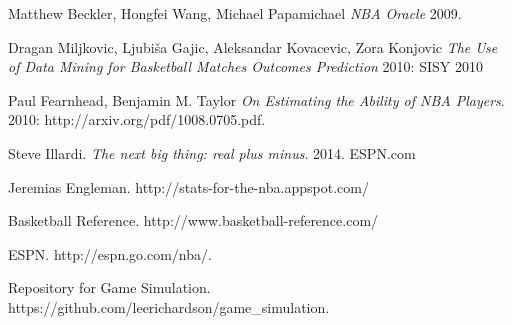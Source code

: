\documentclass{article}
\begin{document}
 
  \begin{thebibliography}{1}

   Matthew Beckler, Hongfei Wang, Michael Papamichael {\em NBA Oracle} 2009.

   Dragan Miljkovic, Ljubiša Gajic, Aleksandar Kovacevic, Zora Konjovic {\em The Use of Data Mining for Basketball Matches
Outcomes Prediction} 2010: SISY 2010

   Paul Fearnhead, Benjamin M. Taylor {\em On Estimating the Ability of NBA Players}. 2010: http://arxiv.org/pdf/1008.0705.pdf.

   Steve Illardi. {\em The next big thing: real plus minus}. 2014. ESPN.com

   Jeremias Engleman. http://stats-for-the-nba.appspot.com/

   Basketball Reference. http://www.basketball-reference.com/

   ESPN. http://espn.go.com/nba/.

   Repository for Game Simulation. https://github.com/leerichardson/game\_simulation.

  \end{thebibliography}
\end{document}
